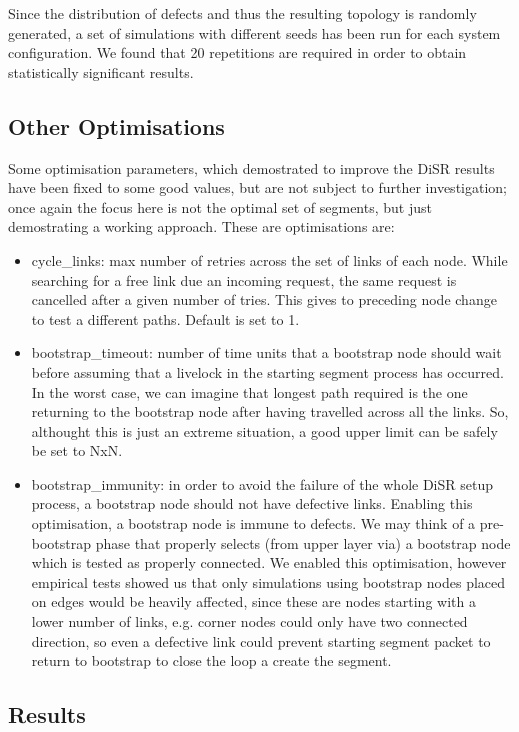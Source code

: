Since the distribution of defects and thus the resulting topology is randomly
generated, a set of simulations with different seeds has been run
for each system configuration. We found that 20 repetitions are
required in order to obtain statistically significant results.

\subsection{Other Optimisations}
Some optimisation parameters, which demostrated to improve the DiSR
results have been fixed to some good values, but are not subject to
further investigation; once again the focus here is not the
optimal set of segments, but just demostrating a working approach. 
These are optimisations are:
\begin{itemize}
\item{cycle\_links}: max number of retries across the set of links of
each node. While searching for a free link due an incoming request,
the same request is cancelled after a given number of tries. This
gives to preceding node change to test a different paths. Default is set to 1.
\item{bootstrap\_timeout}: number of time units that a bootstrap node
should wait before assuming that a livelock in the starting segment
process has occurred. In the worst case, we can imagine that longest
path required is the one returning to the bootstrap node after having
travelled across all the links. So, althought this is just an extreme
situation, a good upper limit can be safely be set to NxN.
\item{bootstrap\_immunity}: in order to avoid the failure of the whole DiSR
setup process, a bootstrap node should not have defective links.
Enabling this optimisation, a bootstrap node is immune to defects.
We may think of a pre-bootstrap phase that properly selects (from upper
layer via) a bootstrap node which is tested as properly connected. We
enabled this optimisation, however empirical tests showed us that only
simulations using bootstrap nodes placed on edges would be heavily
affected, since these are nodes starting with a lower number of links,
e.g. corner nodes could only have two connected direction, so even a
defective link could prevent starting segment packet to return to
bootstrap to close the loop a create the segment.
\end{itemize}

\subsection{Results}
\label{sec:results}

